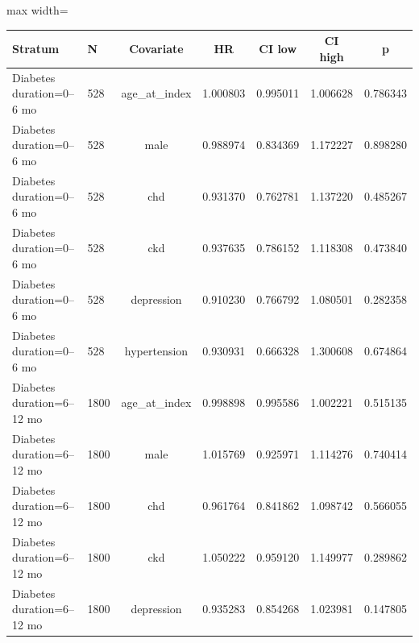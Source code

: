 \documentclass[twoside,11pt]{article}
\begin{document}
\begin{table}[H]
  \centering
  \begin{adjustbox}{max width=\textwidth}
    \begin{tabular}{llccccc}
      \hline
      \textbf{Stratum}            & \textbf{N} & \textbf{Covariate} & \textbf{HR} & \textbf{CI low} & \textbf{CI high} & \textbf{p}                     \\
      \hline
      Diabetes duration=0--6 mo   & 528        & age\_at\_index     & 1.000803    & 0.995011        & 1.006628         & 0.786343                       \\
      Diabetes duration=0--6 mo   & 528        & male               & 0.988974    & 0.834369        & 1.172227         & 0.898280                       \\
      Diabetes duration=0--6 mo   & 528        & chd                & 0.931370    & 0.762781        & 1.137220         & 0.485267                       \\
      Diabetes duration=0--6 mo   & 528        & ckd                & 0.937635    & 0.786152        & 1.118308         & 0.473840                       \\
      Diabetes duration=0--6 mo   & 528        & depression         & 0.910230    & 0.766792        & 1.080501         & 0.282358                       \\
      Diabetes duration=0--6 mo   & 528        & hypertension       & 0.930931    & 0.666328        & 1.300608         & 0.674864                       \\
      \hline
      Diabetes duration=6--12 mo  & 1800       & age\_at\_index     & 0.998898    & 0.995586        & 1.002221         & 0.515135                       \\
      Diabetes duration=6--12 mo  & 1800       & male               & 1.015769    & 0.925971        & 1.114276         & 0.740414                       \\
      Diabetes duration=6--12 mo  & 1800       & chd                & 0.961764    & 0.841862        & 1.098742         & 0.566055                       \\
      Diabetes duration=6--12 mo  & 1800       & ckd                & 1.050222    & 0.959120        & 1.149977         & 0.289862                       \\
      Diabetes duration=6--12 mo  & 1800       & depression         & 0.935283    & 0.854268        & 1.023981         & 0.147805                       \\

\end{tabular}
\end{adjustbox}
\end{table}
\end{document}
